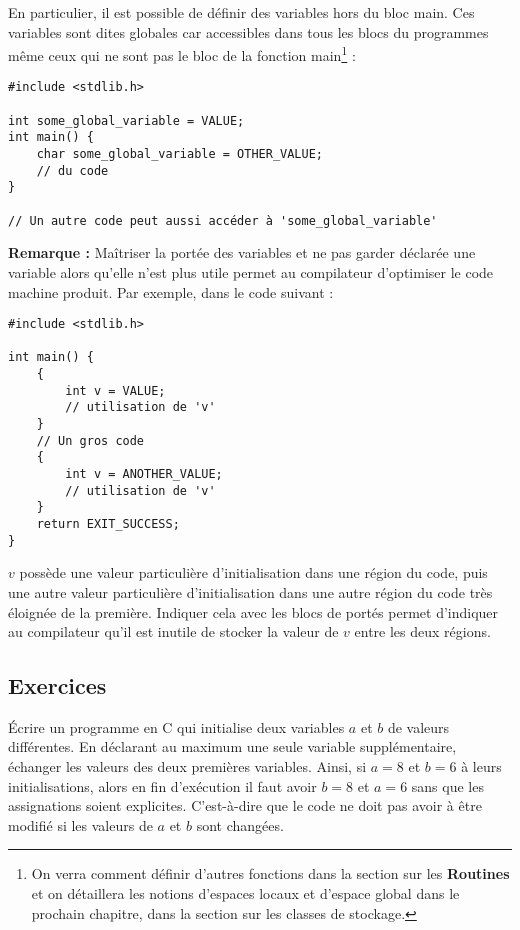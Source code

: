 \documentclass[../../../main.tex]{subfiles}
\begin{document}
En particulier, il est possible de définir des variables hors du bloc \textsf{main}. Ces variables sont dites globales car accessibles dans tous les blocs du programmes même ceux qui ne sont pas le bloc de la fonction \textsf{main}\footnote{On verra comment définir d'autres fonctions dans la section sur les \textbf{Routines} et on détaillera les notions d'espaces locaux et d'espace global dans le prochain chapitre, dans la section sur les classes de stockage.} :
\begin{verbatim}
#include <stdlib.h>

int some_global_variable = VALUE;
int main() {
	char some_global_variable = OTHER_VALUE;
	// du code
}

// Un autre code peut aussi accéder à 'some_global_variable'
\end{verbatim}
\textbf{Remarque :} Maîtriser la portée des variables et ne pas garder déclarée une variable alors qu'elle n'est plus utile permet au compilateur d'optimiser le code machine produit. Par exemple, dans le code suivant :
\begin{verbatim}
#include <stdlib.h>

int main() {
	{
		int v = VALUE;
		// utilisation de 'v'
	}
	// Un gros code
	{
		int v = ANOTHER_VALUE;
		// utilisation de 'v'
	}
	return EXIT_SUCCESS;
}
\end{verbatim}
$v$ possède une valeur particulière d'initialisation dans une région du code, puis une autre valeur particulière d'initialisation dans une autre région du code très éloignée de la première. Indiquer cela avec les blocs de portés permet d'indiquer au compilateur qu'il est inutile de stocker la valeur de $v$ entre les deux régions.
\subsection{Exercices}
 Écrire un programme en C qui initialise deux variables $a$ et $b$ de valeurs différentes. En déclarant au maximum une seule variable supplémentaire, échanger les valeurs des deux premières variables. Ainsi, si $a = 8$ et $b = 6$ à leurs initialisations, alors en fin d'exécution il faut avoir $b = 8$ et $a = 6$ sans que les assignations soient explicites. C'est-à-dire que le code ne doit pas avoir à être modifié si les valeurs de $a$ et $b$ sont changées.
\end{document}
